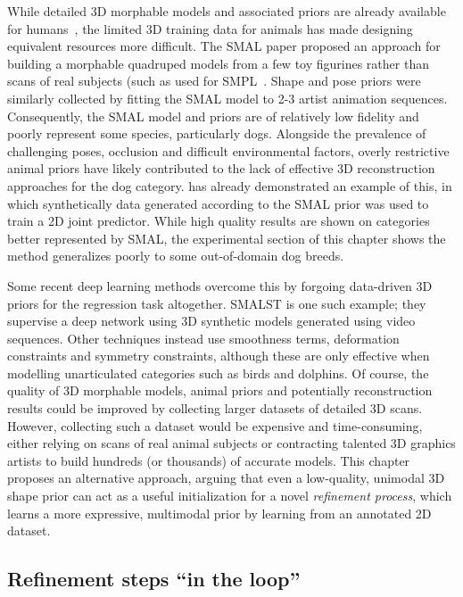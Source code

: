 While detailed 3D morphable models and associated priors are already available for humans~, the limited 3D training data for animals has made designing equivalent resources more difficult. The SMAL paper proposed an approach for building a morphable quadruped models from a few toy figurines rather than scans of real subjects (such as used for SMPL~. Shape and pose priors were similarly collected by fitting the SMAL model to 2-3 artist animation sequences. Consequently, the SMAL model and priors are of relatively low fidelity and poorly represent some species, particularly dogs. Alongside the prevalence of challenging poses, occlusion and difficult environmental factors, overly restrictive animal priors have likely contributed to the lack of effective 3D reconstruction approaches for the dog category.  has already demonstrated an example of this, in which synthetically data generated according to the SMAL prior was used to train a 2D joint predictor. While high quality results are shown on categories better represented by SMAL, the experimental section of this chapter shows the method generalizes poorly to some out-of-domain dog breeds. 

Some recent deep learning methods overcome this by forgoing data-driven 3D priors for the regression task altogether. SMALST is one such example; they supervise a deep network using 3D synthetic models generated using video sequences. Other techniques  instead use smoothness terms, deformation constraints and symmetry constraints, although these are only effective when modelling unarticulated categories such as birds and dolphins. Of course, the quality of 3D morphable models, animal priors and potentially reconstruction results could be improved by collecting larger datasets of detailed 3D scans. However, collecting such a dataset would be expensive and time-consuming, either relying on scans of real animal subjects or contracting talented 3D graphics artists to build hundreds (or thousands) of accurate models. This chapter proposes an alternative approach, arguing that even a low-quality, unimodal 3D shape prior can act as a useful initialization for a novel \emph{refinement process}, which learns a more expressive, multimodal prior by learning from an annotated 2D dataset.

\subsection{Refinement steps ``in the loop''}

